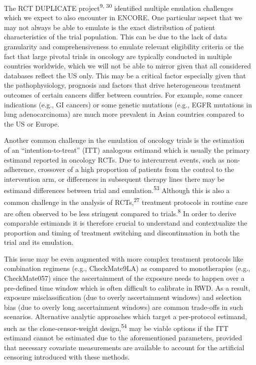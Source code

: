 \documentclass[
  letterpaper,
  DIV=11,
  numbers=noendperiod]{scrartcl}
\begin{document}
The RCT DUPLICATE project\textsuperscript{9, 30} identified multiple
emulation challenges which we expect to also encounter in ENCORE. One
particular aspect that we may not always be able to emulate is the exact
distribution of patient characteristics of the trial population. This
can be due to the lack of data granularity and comprehensiveness to
emulate relevant eligibility criteria or the fact that large pivotal
trials in oncology are typically conducted in multiple countries
worldwide, which we will not be able to mirror given that all considered
databases reflect the US only. This may be a critical factor especially
given that the pathophysiology, prognosis and factors that drive
heterogeneous treatment outcomes of certain cancers differ between
countries. For example, some cancer indications (e.g., GI cancers) or
some genetic mutations (e.g., EGFR mutations in lung adenocarcinoma) are
much more prevalent in Asian countries compared to the US or Europe.

Another common challenge in the emulation of oncology trials is the
estimation of an ``intention-to-treat'' (ITT) analogous estimand which
is usually the primary estimand reported in oncology RCTs. Due to
intercurrent events, such as non-adherence, crossover of a high
proportion of patients from the control to the intervention arm, or
differences in subsequent therapy lines there may be estimand
differences between trial and emulation.\textsuperscript{53} Although
this is also a common challenge in the analysis of
RCTs,\textsuperscript{27} treatment protocols in routine care are often
observed to be less stringent compared to trials.\textsuperscript{8} In
order to derive comparable estimands it is therefore crucial to
understand and contextualize the proportion and timing of treatment
switching and discontinuation in both the trial and its emulation.

This issue may be even augmented with more complex treatment protocols
like combination regimens (e.g., CheckMate9LA) as compared to
monotherapies (e.g., CheckMate057) since the ascertainment of the
exposure needs to happen over a pre-defined time window which is often
difficult to calibrate in RWD. As a result, exposure misclassification
(due to overly ascertainment windows) and selection bias (due to overly
long ascertainment windows) are common trade-offs in such scenarios.
Alternative analytic approaches which target a per-protocol estimand,
such as the clone-censor-weight design,\textsuperscript{54} may be
viable options if the ITT estimand cannot be estimated due to the
aforementioned parameters, provided that necessary covariate
measurements are available to account for the artificial censoring
introduced with these methods.
\end{document}
